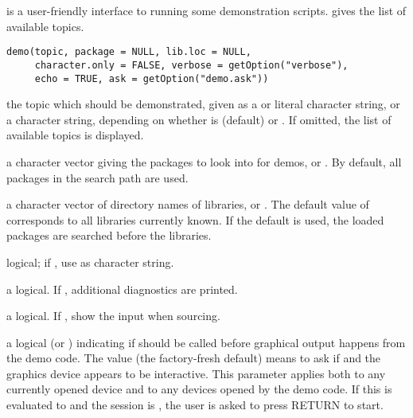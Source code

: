 %
\begin{Description}\relax
{} is a user-friendly interface to running some demonstration
\R{} scripts.   gives the list of available topics.
\end{Description}
%
\begin{Usage}
\begin{verbatim}
demo(topic, package = NULL, lib.loc = NULL,
     character.only = FALSE, verbose = getOption("verbose"),
     echo = TRUE, ask = getOption("demo.ask"))
\end{verbatim}
\end{Usage}
%
\begin{Arguments}
\begin{ldescription}
\item[\code{topic}] the topic which should be demonstrated, given as a
 or literal character string, or a character string,
depending on whether  is  (default)
or .  If omitted, the list of available topics is
displayed.
\item[\code{package}] a character vector giving the packages to look into for
demos, or .  By default, all packages in the search path
are used.
\item[\code{lib.loc}] a character vector of directory names of \R{} libraries,
or .  The default value of  corresponds to all
libraries currently known.  If the default is used, the loaded
packages are searched before the libraries.
\item[\code{character.only}] logical; if , use  as
character string.
\item[\code{verbose}] a logical.  If , additional diagnostics are
printed.
\item[\code{echo}] a logical.  If , show the \R{} input when sourcing.
\item[\code{ask}] a logical (or ) indicating if
 should be called before
graphical output happens from the demo code.  The value
 (the factory-fresh default) means to ask if
 and the graphics device appears to be
interactive.  This parameter applies both to any currently opened
device and to any devices opened by the demo code.  If this is
evaluated to  and the session is , the
user is asked to press RETURN to start.
\end{ldescription}
\end{Arguments}
